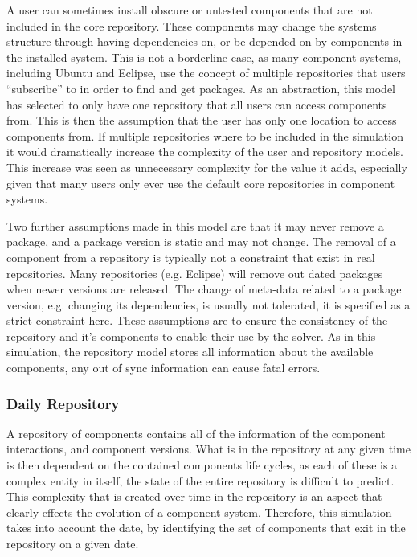 A user can sometimes install obscure or untested components that are not included in the core repository.
These components may change the systems structure through having dependencies on, or be depended on by components in the installed system.
This is not a borderline case, as many component systems, including Ubuntu and Eclipse, use the concept of multiple repositories that users ``subscribe'' to in order to find and get packages.
As an abstraction, this model has selected to only have one repository that all users can access components from.
This is then the assumption that the user has only one location to access components from.
If multiple repositories where to be included in the simulation it would dramatically increase the complexity of the user and repository models.
This increase was seen as unnecessary complexity for the value it adds, especially given that many users only ever use the default core repositories in component systems.

Two further assumptions made in this model are that it may never remove a package, and a package version is static and may not change.
The removal of a component from a repository is typically not a constraint that exist in real repositories.
Many repositories (e.g. Eclipse) will remove out dated packages when newer versions are released.
The change of meta-data related to a package version, e.g. changing its dependencies, is usually not tolerated, it is specified as a strict constraint here.
These assumptions are to ensure the consistency of the repository and it's components to enable their use by the solver. 
As in this simulation, the repository model stores all information about the available components, any out of sync information can cause fatal errors.

\subsubsection{Daily Repository}
A repository of components contains all of the information of the component interactions, and component versions.
What is in the repository at any given time is then dependent on the contained components life cycles,
as each of these is a complex entity in itself, the state of the entire repository is difficult to predict.
This complexity that is created over time in the repository is an aspect that clearly effects the evolution of a component system.
Therefore, this simulation takes into account the date, by identifying the set of components that exit in the repository on a given date.

